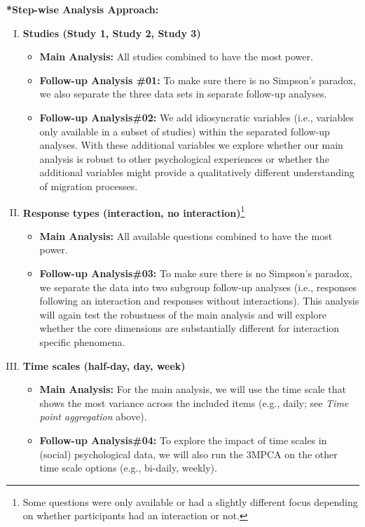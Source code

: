 \documentclass[]{article}
\newcounter{question}
\let\rmarkdownfootnote\footnote%
\def\footnote{\protect\rmarkdownfootnote}
\begin{document}
\textbf{*Step-wise Analysis Approach:}

\begin{enumerate}[I.]
  \item \textbf{Studies (Study 1, Study 2, Study 3)}
    \begin{itemize}
      \item \textbf{Main Analysis:} All studies combined to have the most power.
      \item \textbf{Follow-up Analysis \#01:} To make sure there is no Simpson's paradox, we also separate the three data sets in separate follow-up analyses.
      \item \textbf{Follow-up Analysis\#02:} We add idiosyncratic variables (i.e., variables only available in a subset of studies) within the separated follow-up analyses. With these additional variables we explore whether our main analysis is robust to other psychological experiences or whether the additional variables might provide a qualitatively different understanding of migration processes.
    \end{itemize}
  \item \textbf{Response types (interaction, no interaction)}\footnote{Some questions were only available or had a slightly different focus depending on whether participants had an interaction or not.}
    \begin{itemize}
      \item \textbf{Main Analysis:} All available questions combined to have the most power.
      \item \textbf{Follow-up Analysis\#03:} To make sure there is no Simpson's paradox, we separate the data into two subgroup follow-up analyses (i.e., responses following an interaction and responses without interactions). This analysis will again test the robustness of the main analysis and will explore whether the core dimensions are substantially different for interaction specific phenomena.
    \end{itemize}
  \item \textbf{Time scales (half-day, day, week)}
    \begin{itemize}
      \item \textbf{Main Analysis:} For the main analysis, we will use the time scale that shows the most variance across the included items (e.g., daily; see \textit{Time point aggregation} above).
      \item \textbf{Follow-up Analysis\#04:} To explore the impact of time scales in (social) psychological data, we will also run the 3MPCA on the other time scale options (e.g., bi-daily, weekly). 
    \end{itemize}
\end{enumerate}
\end{document}
